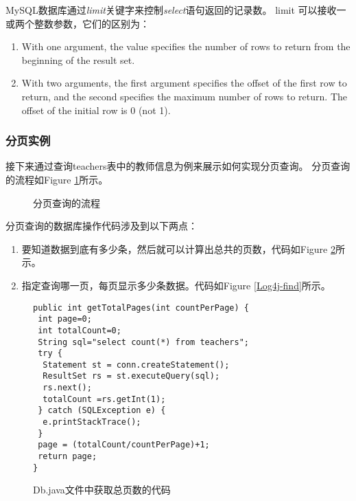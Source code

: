 MySQL数据库通过\emph{limit}关键字来控制\emph{select}语句返回的记录数。
limit 可以接收一或两个整数参数，它们的区别为：
\begin{enumerate}
\item
With one argument, the value specifies the number of rows to return from the beginning of the result set.

\item
With two arguments, the first argument specifies the offset of the first row to return, and the second specifies the maximum number of rows to return. The offset of the initial row is 0 (not 1).

\end{enumerate}
\subsubsection{分页实例}
接下来通过查询teachers表中的教师信息为例来展示如何实现分页查询。
分页查询的流程如Figure \ref{Log4j-pro}所示。
\begin{figure}

\caption{分页查询的流程}
\label{Log4j-pro}
\end{figure}

分页查询的数据库操作代码涉及到以下两点：
\begin{enumerate}
\item
要知道数据到底有多少条，然后就可以计算出总共的页数，代码如Figure \ref{Log4j-page}所示。
\item
指定查询哪一页，每页显示多少条数据。代码如Figure \ref{Log4j-find}所示。
\end{enumerate}

\begin{figure}
\begin{verbatim}
public int getTotalPages(int countPerPage) {
 int page=0;
 int totalCount=0;
 String sql="select count(*) from teachers";
 try {
  Statement st = conn.createStatement();
  ResultSet rs = st.executeQuery(sql);
  rs.next();
  totalCount =rs.getInt(1);
 } catch (SQLException e) {
  e.printStackTrace();
 }
 page = (totalCount/countPerPage)+1;
 return page;
}
\end{verbatim}
\caption{Db.java文件中获取总页数的代码}
\label{Log4j-page}
\end{figure}

